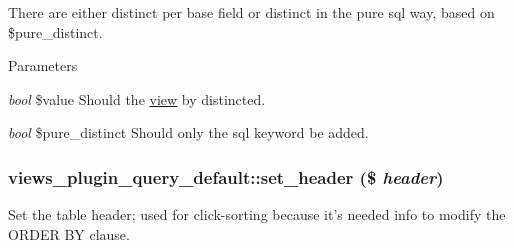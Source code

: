 There are either distinct per base field or distinct in the pure sql way, based on \$pure\_\-distinct.


\begin{DoxyParams}{Parameters}
\item[{\em bool}]\$value Should the \hyperlink{classview}{view} by distincted. \item[{\em bool}]\$pure\_\-distinct Should only the sql keyword be added. \end{DoxyParams}
\hypertarget{classviews__plugin__query__default_a604b0a86224c6e71447338234795dafc}{
\subsubsection[{set\_\-header}]{\setlength{\rightskip}{0pt plus 5cm}views\_\-plugin\_\-query\_\-default::set\_\-header (\$ {\em header})}}
\label{classviews__plugin__query__default_a604b0a86224c6e71447338234795dafc}
Set the table header; used for click-\/sorting because it's needed info to modify the ORDER BY clause. 

